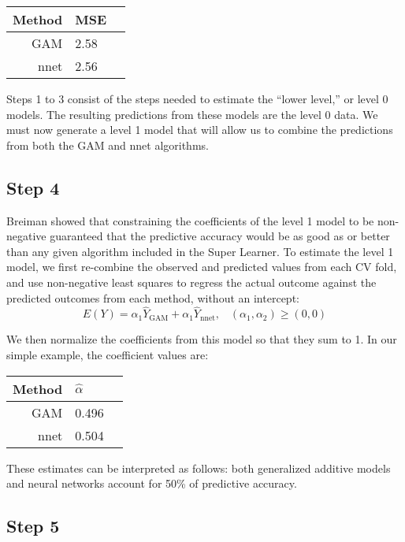 \documentclass[12pt]{article}
\begin{document}
\begin{table}[ht]
\centering
\begin{tabular}{rll}
  \hline
 Method & MSE \\ 
  \hline
GAM & 2.58 \\ 
nnet & 2.56 \\ 
   \hline
\end{tabular}
\end{table}

Steps 1 to 3 consist of the steps needed to estimate the ``lower level,'' or level 0 models. The resulting predictions from these models are the level 0 data. We must now generate a level 1 model that will allow us to combine the predictions from both the GAM and nnet algorithms. 

\subsection*{Step 4}
Breiman showed that constraining the coefficients of the level 1 model to be non-negative guaranteed that the predictive accuracy would be as good as or better than any given algorithm included in the Super Learner. To estimate the level 1 model, we first re-combine the observed and predicted values from each CV fold, and use non-negative least squares to regress the actual outcome against the predicted outcomes from each method, without an intercept:
\begin{equation}
	E(Y) = \alpha_1\hat{Y}_{\text{GAM}} +  \alpha_1\hat{Y}_{\text{nnet}}, \;\;\; (\alpha_1 , \alpha_2) \geq (0,0)
\end{equation}

We then normalize the coefficients from this model so that they sum to 1. In our simple example, the coefficient values are:
\begin{table}[ht]
\centering
\begin{tabular}{rll}
  \hline
 Method & $\hat{\alpha}$ \\ 
  \hline
 GAM & 0.496 \\ 
 nnet & 0.504 \\ 
   \hline
\end{tabular}
\end{table}


These estimates can be interpreted as follows: both generalized additive models and neural networks account for 50\% of predictive accuracy.

\subsection*{Step 5}
\end{document}
